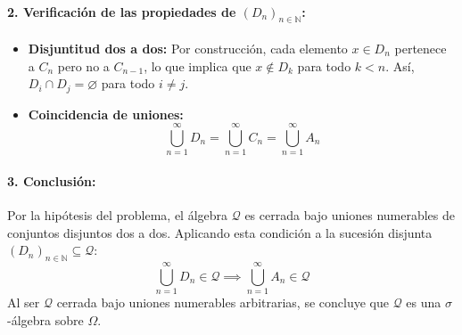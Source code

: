 \begin{problema}
\paragraph{2. Verificación de las propiedades de $(D_n)_{n \in \mathbb{N}}$:}
\begin{itemize}
    \item \textbf{Disjuntitud dos a dos:} Por construcción, cada elemento $x \in D_n$ pertenece a $C_n$ pero no a $C_{n-1}$, lo que implica que $x \notin D_k$ para todo $k < n$. Así, $D_i \cap D_j = \varnothing$ para todo $i \neq j$.
    \item \textbf{Coincidencia de uniones:}
    \[
        \bigcup_{n=1}^\infty D_n = \bigcup_{n=1}^\infty C_n = \bigcup_{n=1}^\infty A_n
    \]
\end{itemize}

\paragraph{3. Conclusión:}
Por la hipótesis del problema, el álgebra $\mathcal{Q}$ es cerrada bajo uniones numerables de conjuntos disjuntos dos a dos. Aplicando esta condición a la sucesión disjunta $(D_n)_{n \in \mathbb{N}} \subseteq \mathcal{Q}$:
\[
    \bigcup_{n=1}^\infty D_n \in \mathcal{Q} \implies \bigcup_{n=1}^\infty A_n \in \mathcal{Q}
\]
Al ser $\mathcal{Q}$ cerrada bajo uniones numerables arbitrarias, se concluye que $\mathcal{Q}$ es una $\sigma$-álgebra sobre $\Omega$.
\end{problema}